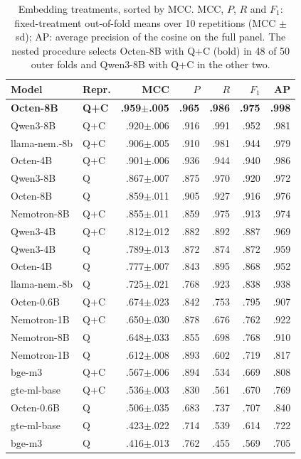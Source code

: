 \begin{table}[t]
\centering
\footnotesize
\setlength{\tabcolsep}{2.6pt}
\begin{tabular}{@{}llrrrrr@{}}
\toprule
Model & Repr. & MCC & $P$ & $R$ & $F_1$ & AP \\
\midrule
\textbf{Octen-8B} & \textbf{Q+C} & \textbf{.959$\pm$.005} & \textbf{.965} & \textbf{.986} & \textbf{.975} & \textbf{.998} \\
Qwen3-8B & Q+C & .920$\pm$.006 & .916 & .991 & .952 & .981 \\
llama-nem.-8b & Q+C & .906$\pm$.005 & .910 & .981 & .944 & .979 \\
Octen-4B & Q+C & .901$\pm$.006 & .936 & .944 & .940 & .986 \\
Qwen3-8B & Q & .867$\pm$.007 & .875 & .970 & .920 & .972 \\
Octen-8B & Q & .859$\pm$.011 & .905 & .927 & .916 & .976 \\
Nemotron-8B & Q+C & .855$\pm$.011 & .859 & .975 & .913 & .974 \\
Qwen3-4B & Q+C & .812$\pm$.012 & .882 & .892 & .887 & .969 \\
Qwen3-4B & Q & .789$\pm$.013 & .872 & .874 & .872 & .959 \\
Octen-4B & Q & .777$\pm$.007 & .843 & .895 & .868 & .952 \\
llama-nem.-8b & Q & .725$\pm$.021 & .768 & .923 & .838 & .938 \\
Octen-0.6B & Q+C & .674$\pm$.023 & .842 & .753 & .795 & .907 \\
Nemotron-1B & Q+C & .650$\pm$.030 & .878 & .676 & .762 & .922 \\
Nemotron-8B & Q & .648$\pm$.033 & .855 & .698 & .768 & .910 \\
Nemotron-1B & Q & .612$\pm$.008 & .893 & .602 & .719 & .817 \\
bge-m3 & Q+C & .567$\pm$.006 & .894 & .534 & .669 & .808 \\
gte-ml-base & Q+C & .536$\pm$.003 & .830 & .561 & .670 & .769 \\
Octen-0.6B & Q & .506$\pm$.035 & .683 & .737 & .707 & .840 \\
gte-ml-base & Q & .423$\pm$.022 & .714 & .539 & .614 & .722 \\
bge-m3 & Q & .416$\pm$.013 & .762 & .455 & .569 & .705 \\
\bottomrule
\end{tabular}
\caption{Embedding treatments, sorted by MCC. MCC, $P$, $R$ and $F_1$:
fixed-treatment out-of-fold means over 10 repetitions (MCC $\pm$ sd); AP:
average precision of the cosine on the full panel. The nested procedure
selects Octen-8B with Q+C (bold) in 48 of 50 outer folds and Qwen3-8B with
Q+C in the other two.}
\label{tab:dedup-semantic}
\end{table}

